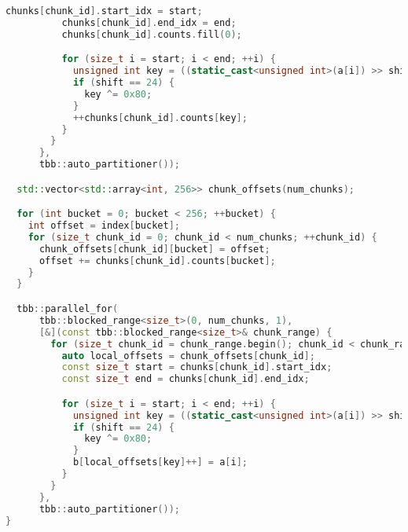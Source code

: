 \documentclass[12pt]{article}
\begin{document}
\begin{lstlisting}[language=C++]
          chunks[chunk_id].start_idx = start;
          chunks[chunk_id].end_idx = end;
          chunks[chunk_id].counts.fill(0);

          for (size_t i = start; i < end; ++i) {
            unsigned int key = ((static_cast<unsigned int>(a[i]) >> shift) & 0xFFU);
            if (shift == 24) {
              key ^= 0x80;
            }
            ++chunks[chunk_id].counts[key];
          }
        }
      },
      tbb::auto_partitioner());

  std::vector<std::array<int, 256>> chunk_offsets(num_chunks);

  for (int bucket = 0; bucket < 256; ++bucket) {
    int offset = index[bucket];
    for (size_t chunk_id = 0; chunk_id < num_chunks; ++chunk_id) {
      chunk_offsets[chunk_id][bucket] = offset;
      offset += chunks[chunk_id].counts[bucket];
    }
  }

  tbb::parallel_for(
      tbb::blocked_range<size_t>(0, num_chunks, 1),
      [&](const tbb::blocked_range<size_t>& chunk_range) {
        for (size_t chunk_id = chunk_range.begin(); chunk_id < chunk_range.end(); ++chunk_id) {
          auto local_offsets = chunk_offsets[chunk_id];
          const size_t start = chunks[chunk_id].start_idx;
          const size_t end = chunks[chunk_id].end_idx;

          for (size_t i = start; i < end; ++i) {
            unsigned int key = ((static_cast<unsigned int>(a[i]) >> shift) & 0xFFU);
            if (shift == 24) {
              key ^= 0x80;
            }
            b[local_offsets[key]++] = a[i];
          }
        }
      },
      tbb::auto_partitioner());
}
\end{lstlisting}
\end{document}
